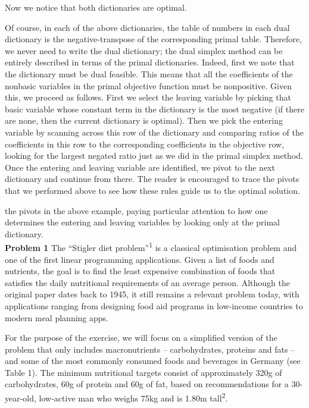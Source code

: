 \documentclass{article}
\begin{document}
Now we notice that both dictionaries are optimal.

Of course, in each of the above dictionaries, the table of numbers in each dual dictionary is the negative-transpose of the corresponding primal table. Therefore, we never need to write the dual dictionary; the dual simplex method can be entirely described in terms of the primal dictionaries. Indeed, first we note that the dictionary must be dual feasible. This means that all the coefficients of the nonbasic variables in the primal objective function must be nonpositive. Given this, we proceed as follows. First we select the leaving variable by picking that basic variable whose constant term in the dictionary is the most negative (if there are none, then the current dictionary is optimal). Then we pick the entering variable by scanning across this row of the dictionary and comparing ratios of the coefficients in this row to the corresponding coefficients in the objective row, looking for the largest negated ratio just as we did in the primal simplex method. Once the entering and leaving variable are identified, we pivot to the next dictionary and continue from there. The reader is encouraged to trace the pivots that we performed above to see how these rules guide us to the optimal solution.

the pivots in the above example, paying particular attention to how one determines the
entering and leaving variables by looking only at the primal dictionary.
\\[5mm]
\textbf{Problem 1}
The ``Stigler diet problem''\textsuperscript{1} is a classical optimisation problem and one of the first linear programming applications. Given a list of foods and nutrients, the goal is to find the least expensive combination of foods that satisfies the daily nutritional requirements of an average person. Although the original paper dates back to 1945, it still remains a relevant problem today, with applications ranging from designing food aid programs in low-income countries to modern meal planning apps.

For the purpose of the exercise, we will focus on a simplified version of the problem that only includes macronutrients -- carbohydrates, proteins and fats -- and some of the most commonly consumed foods and beverages in Germany (see Table 1). The minimum nutritional targets consist of approximately 320g of carbohydrates, 60g of protein and 60g of fat, based on recommendations for a 30-year-old, low-active man who weighs 75kg and is 1.80m tall\textsuperscript{2}.
\end{document}
